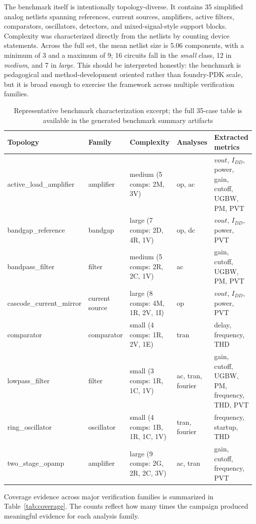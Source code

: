 \documentclass[conference]{IEEEtran}
\begin{document}
The benchmark itself is intentionally topology-diverse. It contains 35 simplified analog netlists spanning references, current sources, amplifiers, active filters, comparators, oscillators, detectors, and mixed-signal-style support blocks. Complexity was characterized directly from the netlists by counting device statements. Across the full set, the mean netlist size is 5.06 components, with a minimum of 3 and a maximum of 9; 16 circuits fall in the \emph{small} class, 12 in \emph{medium}, and 7 in \emph{large}. This should be interpreted honestly: the benchmark is pedagogical and method-development oriented rather than foundry-PDK scale, but it is broad enough to exercise the framework across multiple verification families.

\begin{table}[t]
\caption{Representative benchmark characterization excerpt; the full 35-case table is available in the generated benchmark summary artifacts}
\label{tab:benchmarkdetail}
\centering
\scriptsize
\begin{tabular}{lllll}
\toprule
Topology & Family & Complexity & Analyses & Extracted metrics \\
\midrule
active\_load\_amplifier & amplifier & medium (5 comps: 2M, 3V) & op, ac & $vout$, $I_{DD}$, power, gain, cutoff, UGBW, PM, PVT \\
bandgap\_reference & bandgap & large (7 comps: 2D, 4R, 1V) & op, dc & $vout$, $I_{DD}$, power, PVT \\
bandpass\_filter & filter & medium (5 comps: 2R, 2C, 1V) & ac & gain, cutoff, UGBW, PM, PVT \\
cascode\_current\_mirror & current source & large (8 comps: 4M, 1R, 2V, 1I) & op & $vout$, $I_{DD}$, power, PVT \\
comparator & comparator & small (4 comps: 1R, 2V, 1E) & tran & delay, frequency, THD \\
lowpass\_filter & filter & small (3 comps: 1R, 1C, 1V) & ac, tran, fourier & gain, cutoff, UGBW, PM, frequency, THD, PVT \\
ring\_oscillator & oscillator & small (4 comps: 1B, 1R, 1C, 1V) & tran, fourier & frequency, startup, THD \\
two\_stage\_opamp & amplifier & large (9 comps: 2G, 2R, 2C, 3V) & ac, tran & gain, cutoff, frequency, PVT \\
\bottomrule
\end{tabular}
\end{table}

Coverage evidence across major verification families is summarized in Table~\ref{tab:coverage}. The counts reflect how many times the campaign produced meaningful evidence for each analysis family.
\end{document}
